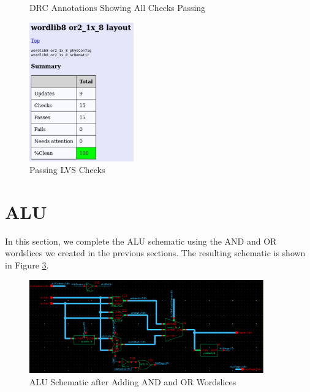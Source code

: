 \documentclass{article}
\begin{document}
	\begin{figure}[H]
		\centerline{}
		\caption{DRC Annotations Showing All Checks Passing}
		\label{fig::or_drc}
	\end{figure}
	
	\begin{figure}[H]
		\centerline{\includegraphics[width=0.4\textwidth]{or_lvs.png}}
		\caption{Passing LVS Checks}
		\label{fig::or_lvs}
	\end{figure}
	
	\section{ALU}
	
	In this section, we complete the ALU schematic using the AND and OR wordslices we created in the previous sections. The resulting schematic is shown in Figure \ref{fig::alu_schematic}.
	
	\begin{figure}[H]
		\centerline{\includegraphics[width=0.9\textwidth]{alu_schematic.png}}
		\caption{ALU Schematic after Adding AND and OR Wordslices}
		\label{fig::alu_schematic}
	\end{figure}
	
\end{document}
